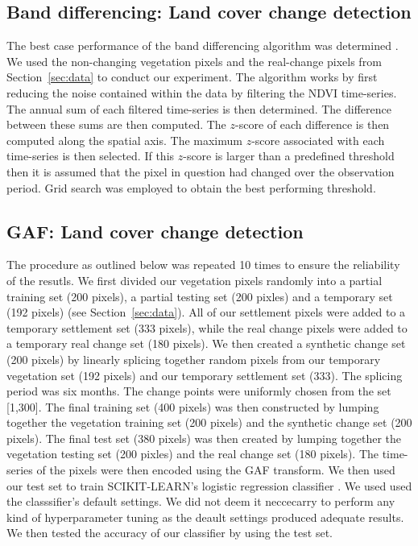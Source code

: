 \documentclass{article}
\begin{document}
\subsection{Band differencing: Land cover change detection}
\label{sec:diff}
The best case performance of the band differencing algorithm was determined \cite{lunetta2006}. We used the non-changing vegetation pixels and the real-change pixels from Section~\ref{sec:data} to conduct our experiment. The algorithm works by first reducing the noise contained within the data by filtering the NDVI time-series. The annual sum of each filtered time-series is then determined. The difference between these sums are then computed. The $z$-score of each difference is then computed along the spatial axis. The maximum $z$-score associated with each time-series is then selected. If this $z$-score is larger than a predefined threshold then it is assumed that the pixel in question had changed over the observation period. Grid search was employed to obtain the best performing threshold.


\subsection{GAF: Land cover change detection}
\label{sec:gaf_change}
The procedure as outlined below was repeated 10 times to ensure the reliability of the resutls. We first divided our vegetation pixels randomly into a partial training set (200 pixels), a partial testing set (200 pixles) and a temporary set (192 pixels) (see Section~\ref{sec:data}). All of our settlement pixels were added to a temporary settlement set (333 pixels), while the real change pixels were added to a temporary real change set (180 pixels). We then created a synthetic change set (200 pixels) by linearly splicing together random pixels from our temporary vegetation set (192 pixels) and our temporary settlement set (333). The splicing period was six months. The change points were uniformly chosen from the set [1,300]. The final training  set (400 pixels) was then constructed by lumping together the vegetation training set (200 pixels) and the synthetic change set (200 pixels). The final test set (380 pixels) was then created by lumping together the vegetation testing set (200 pixles) and the real change set (180 pixels). The time-series of the pixels were then encoded using the GAF transform. We then used our test set to train \textsc{SCIKIT-LEARN}'s logistic regression classifier \cite{scikit2011}. We used used the classsifier's default settings. We did not deem it neccecarry to perform any kind of hyperparameter tuning as the deault settings produced adequate results. We then tested the accuracy of our classifier by using the test set. 
\end{document}
